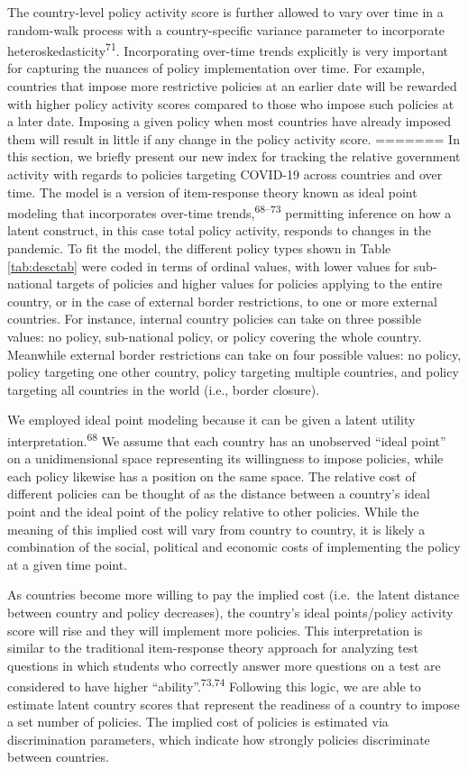 \documentclass[]{article}
\begin{document}
The country-level policy activity score is further allowed to vary over time in a random-walk process with a country-specific variance parameter to incorporate heteroskedasticity\textsuperscript{71}. Incorporating over-time trends explicitly is very important for capturing the nuances of policy implementation over time. For example, countries that impose more restrictive policies at an earlier date will be rewarded with higher policy activity scores compared to those who impose such policies at a later date. Imposing a given policy when most countries have already imposed them will result in little if any change in the policy activity score.
=======
In this section, we briefly present our new index for tracking the relative government activity with regards to policies targeting COVID-19 across countries and over time. The model is a version of item-response theory known as ideal point modeling that incorporates over-time trends,\textsuperscript{68--73} permitting inference on how a latent construct, in this case total policy activity, responds to changes in the pandemic. To fit the model, the different policy types shown in Table \ref{tab:desctab} were coded in terms of ordinal values, with lower values for sub-national targets of policies and higher values for policies applying to the entire country, or in the case of external border restrictions, to one or more external countries. For instance, internal country policies can take on three possible values: no policy, sub-national policy, or policy covering the whole country. Meanwhile external border restrictions can take on four possible values: no policy, policy targeting one other country, policy targeting multiple countries, and policy targeting all countries in the world (i.e., border closure).

We employed ideal point modeling because it can be given a latent utility interpretation.\textsuperscript{68} We assume that each country has an unobserved ``ideal point'' on a unidimensional space representing its willingness to impose policies, while each policy likewise has a position on the same space. The relative cost of different policies can be thought of as the distance between a country's ideal point and the ideal point of the policy relative to other policies. While the meaning of this implied cost will vary from country to country, it is likely a combination of the social, political and economic costs of implementing the policy at a given time point.

As countries become more willing to pay the implied cost (i.e.~the latent distance between country and policy decreases), the country's ideal points/policy activity score will rise and they will implement more policies. This interpretation is similar to the traditional item-response theory approach for analyzing test questions in which students who correctly answer more questions on a test are considered to have higher ``ability''.\textsuperscript{73,74} Following this logic, we are able to estimate latent country scores that represent the readiness of a country to impose a set number of policies. The implied cost of policies is estimated via discrimination parameters, which indicate how strongly policies discriminate between countries.
\end{document}
